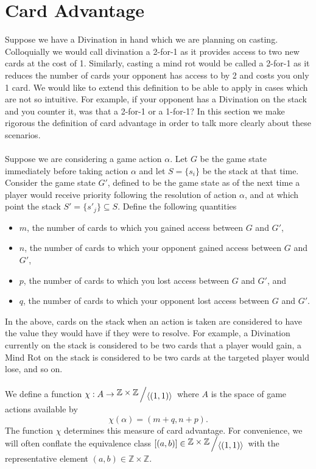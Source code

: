 \documentclass[1pt]{report}
\newcommand{\Z}{\mathbb{Z}}
\newcommand{\<}{\langle}
\renewcommand{\>}{\rangle}
\newcommand{\quot}[2]{{\raisebox{.2em}{$#1$}\left/\raisebox{-.2em}{$#2$}\right.}}
\begin{document}
\chapter{Card Advantage}
Suppose we have a Divination in hand which we are planning on casting. Colloquially we would call divination a 2-for-1 as it provides access to two new cards at the cost of 1. Similarly, casting a mind rot would be called a 2-for-1 as it reduces the number of cards your opponent has access to by 2 and costs you only 1 card. We would like to extend this definition to be able to apply in cases which are not so intuitive. For example, if your opponent has a Divination on the stack and you counter it, was that a 2-for-1 or a 1-for-1? In this section we make rigorous the definition of card advantage in order to talk more clearly about these scenarios.\\
\\
Suppose we are considering a game action $\alpha$. Let $G$ be the game state immediately before taking action $\alpha$ and let $S = \{s_i\}$ be the stack at that time. Consider the game state $G'$, defined to be the game state as of the next time a player would receive priority following the resolution of action $\alpha$, and at which point the stack $S' = \{s'_j\} \subseteq S$. Define the following quantities
\begin{itemize}
\item $m$, the number of cards to which you gained access between $G$ and $G'$,
\item $n$, the number of cards to which your opponent gained access between $G$ and $G'$,
\item $p$, the number of cards to which you lost access between $G$ and $G'$, and
\item $q$, the number of cards to which your opponent lost access between $G$ and $G'$.
\end{itemize}
In the above, cards on the stack when an action is taken are considered to have the value they would have if they were to resolve. For example, a Divination currently on the stack is considered to be two cards that a player would gain, a Mind Rot on the stack is considered to be two cards at the targeted player would lose, and so on. \\
\\
We define a function $\chi : A \to \quot{\Z \times \Z}{\langle (1,1)\rangle}$ where $A$ is the space of game actions available by
$$\chi(\alpha) = (m + q, n + p).$$
The function $\chi$ determines this measure of card advantage. For convenience, we will often conflate the equivalence class $[(a,b)] \in \quot{\Z \times \Z}{\langle(1,1)\rangle}$ with the representative element $(a,b) \in \Z\times \Z$.
\end{document}
